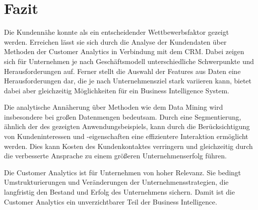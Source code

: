 \clearpage
\section{Fazit}
\label{sec:fazit}
Die Kundennähe konnte als ein entscheidender Wettbewerbsfaktor gezeigt werden. Erreichen lässt sie sich durch die Analyse der Kundendaten über Methoden der Customer Analytics in Verbindung mit dem CRM. Dabei zeigen sich für Unternehmen je nach Geschäftsmodell unterschiedliche Schwerpunkte und Herausforderungen auf.
Ferner stellt die Auswahl der Features aus Daten eine Herausforderungen dar, die je nach Unternehmensziel stark variieren kann, bietet dabei aber gleichzeitig Möglichkeiten für ein Business Intelligence System.

Die analytische Annäherung über Methoden wie dem Data Mining wird insbesondere bei großen Datenmengen bedeutsam.
Durch eine Segmentierung, ähnlich der des gezeigten Anwendungsbeispiels, kann durch die Berücksichtigung von Kundeninteressen und -eigenschaften eine effizientere Interaktion ermöglicht werden.
Dies kann Kosten des Kundenkontaktes verringern und gleichzeitig durch die verbesserte Ansprache zu einem größeren Unternehmenserfolg führen.

Die Customer Analytics ist für Unternehmen von hoher Relevanz.
Sie bedingt Umstrukturierungen und Veränderungen der Unternehmensstrategien, die langfristig den Bestand und Erfolg des Unternehmens sichern.
Damit ist die Customer Analytics ein unverzichtbarer Teil der Business Intelligence.